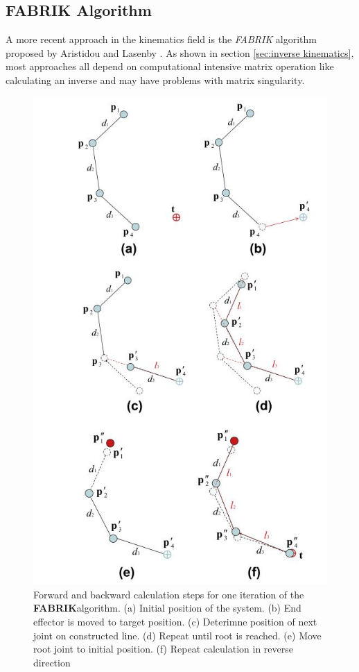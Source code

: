 \subsection{FABRIK Algorithm}
\label{sec:fabrik_algorithm}
A more recent approach in the kinematics field is the \textit{FABRIK} algorithm proposed by Aristidou and Lasenby \cite{Aristidou.2011}. As shown in section \ref{sec:inverse kinematics}, most approaches all depend on computational intensive matrix operation like calculating an inverse and may have problems with matrix singularity.\\
\begin{figure}
\includegraphics[width=\textwidth/2]{images/FabrikIteration.jpg}
\caption{Forward and backward calculation steps for one iteration of the \textbf{FABRIK}algorithm. (a) Initial position of the system. (b) End effector is moved to target position. (c) Deterimne position of next joint on constructed line. (d) Repeat until root is reached. (e) Move root joint to initial position. (f) Repeat calculation in reverse direction \cite{Aristidou.2011} }
\label{fig:Fabrik_Iteration}
\end{figure}
